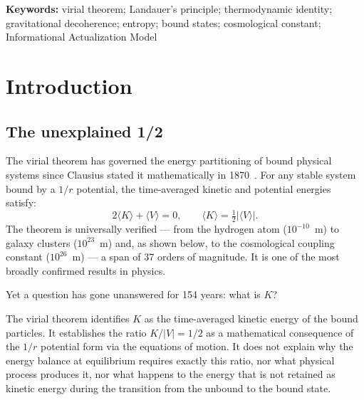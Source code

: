 \documentclass[12pt,a4paper]{article}
\begin{document}
\begin{abstract}
Three of the four fundamental forces satisfy this identity within their
respective domains. The weak nuclear force is a structural exception,
excluded not by coincidence but by physical necessity: the force whose
function is to enable irreversible transitions between stable states cannot
simultaneously satisfy an equilibrium condition. This exception is itself
evidence for the identity's physical content.

We propose that this thermodynamic identity constitutes a fundamental law
of physics of which the virial theorem is the mechanical special case.
\end{abstract}

\noindent\textbf{Keywords:} virial theorem; Landauer's principle;
thermodynamic identity; gravitational decoherence; entropy; bound states;
cosmological constant; Informational Actualization Model

\section{Introduction}
\label{sec:intro}

\subsection{The unexplained 1/2}

The virial theorem has governed the energy partitioning of bound physical
systems since Clausius stated it mathematically in
1870~\citep{Clausius1870}. For any stable system bound by a $1/r$
potential, the time-averaged kinetic and potential energies satisfy:
\begin{equation}
2\langle K \rangle + \langle V \rangle = 0,
\qquad \langle K \rangle = \tfrac{1}{2}|\langle V \rangle|.
\label{eq:virial}
\end{equation}
The theorem is universally verified --- from the hydrogen atom
($10^{-10}$~m) to galaxy clusters ($10^{23}$~m) and, as shown below, to
the cosmological coupling constant ($10^{26}$~m) --- a span of 37 orders
of magnitude. It is one of the most broadly confirmed results in physics.

Yet a question has gone unanswered for 154 years: what is $K$?

The virial theorem identifies $K$ as the time-averaged kinetic energy of
the bound particles. It establishes the ratio $K/|V| = 1/2$ as a
mathematical consequence of the $1/r$ potential form via the equations of
motion. It does not explain why the energy balance at equilibrium requires
exactly this ratio, nor what physical process produces it, nor what happens
to the energy that is not retained as kinetic energy during the transition
from the unbound to the bound state.
\end{document}
